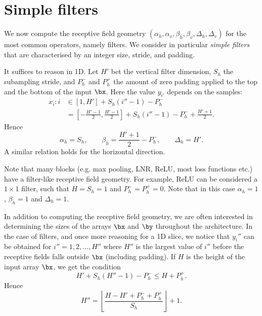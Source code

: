 \section{Simple filters}\label{s:receptive-simple-filters}

We now compute the receptive field geometry $(\alpha_h,\alpha_v,\beta_h,\beta_v,\Delta_h,\Delta_v)$ for the most common operators, namely filters. We consider in particular \emph{simple filters} that are characterised by an integer size, stride, and padding.

It suffices to reason in 1D.  Let $H'$ bet the vertical filter dimension, $S_h$ the subampling stride, and $P_h^-$ and $P_h^+$ the amount of zero padding applied to the top and the bottom of the input $\bx$. Here the value $y_{i'}$ depends on the samples:
\begin{align*}
 x_i : i
 &\in
 [1, H'] + S_h (i'' - 1) - P_h^-
 \\
&=
[-\frac{H'-1}{2}, \frac{H'-1}{2}] + S_h (i''-1) - P_h^- + \frac{H'+1}{2}.
\end{align*}
Hence
\[
\alpha_h = S_h,
\qquad
\beta _h = \frac{H'+1}{2} - P_h^-,
\qquad
\Delta_h = H'.
\]
A similar relation holds for the horizontal direction.

Note that many blocks (e.g. max pooling, LNR, ReLU, most loss functions etc.) have a filter-like receptive field geometry. For example, ReLU can be considered a $1 \times 1$ filter, such that $H = S_h=1$ and $P_h^-=P_h^+ =0$. Note that in this case $\alpha_h=1$, $\beta_h=1$ and $\Delta_h=1$.

In addition to computing the receptive field geometry, we are often interested in determining the sizes of the arrays $\bx$ and $\by$ throughout the architecture. In the case of filters, and once more reasoning for a 1D slice, we notice that $y_i''$ can be obtained for $i''=1,2,\dots,H''$ where $H''$ is the largest value of $i''$ before the receptive fields falls outside $\bx$ (including padding). If $H$ is the height of the input array $\bx$, we get the condition
\[
   H' + S_h (H'' - 1) - P_h^- \leq H + P_h^+.
\]
Hence
\begin{equation}\label{e:filtered-height}
   H'' = \left\lfloor \frac{H - H' + P_h^- + P_h^+}{S_h} \right\rfloor + 1.	
\end{equation}


